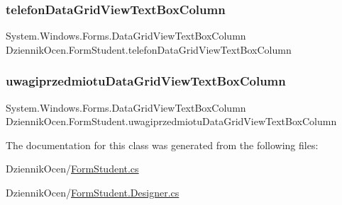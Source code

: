 \subsubsection{\texorpdfstring{telefon\+Data\+Grid\+View\+Text\+Box\+Column}{telefonDataGridViewTextBoxColumn}}
{\footnotesize\ttfamily System.\+Windows.\+Forms.\+Data\+Grid\+View\+Text\+Box\+Column Dziennik\+Ocen.\+Form\+Student.\+telefon\+Data\+Grid\+View\+Text\+Box\+Column\hspace{0.3cm}{\ttfamily [private]}}

\mbox{\label{class_dziennik_ocen_1_1_form_student_a920b3854d830dc870dba5765710fc28d}} 
\subsubsection{\texorpdfstring{uwagiprzedmiotu\+Data\+Grid\+View\+Text\+Box\+Column}{uwagiprzedmiotuDataGridViewTextBoxColumn}}
{\footnotesize\ttfamily System.\+Windows.\+Forms.\+Data\+Grid\+View\+Text\+Box\+Column Dziennik\+Ocen.\+Form\+Student.\+uwagiprzedmiotu\+Data\+Grid\+View\+Text\+Box\+Column\hspace{0.3cm}{\ttfamily [private]}}



The documentation for this class was generated from the following files\+:\begin{DoxyCompactItemize}
\item 
Dziennik\+Ocen/\hyperlink{_form_student_8cs}{Form\+Student.\+cs}\item 
Dziennik\+Ocen/\hyperlink{_form_student_8_designer_8cs}{Form\+Student.\+Designer.\+cs}\end{DoxyCompactItemize}
